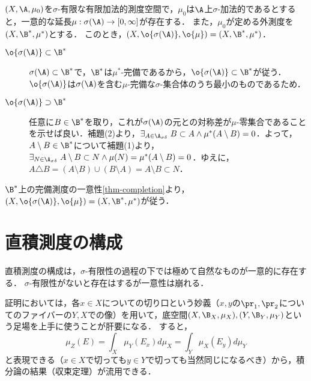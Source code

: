 \documentclass[uplatex, dvipdfmx]{jsreport}
\begin{document}
\begin{theorem}[完備化]\label{thm-complesion-and-extension}
    $(X,\A,\mu_0)$を$\sigma$-有限な有限加法的測度空間で，$\mu_0$は$\A$上$\sigma$-加法的であるとすると，一意的な延長$\mu:\sigma(\A)\to[0,\infty]$が存在する．
    また，$\mu_0$が定める外測度を$(X,\B^*,\mu^*)$とする．
    このとき，$(X,\o{\sigma(\A)},\o{\mu})=(X,\B^*,\mu^*)$．
\end{theorem}
\begin{Proof}\mbox{}
    \begin{description}
        \item[$\o{\sigma(\A)}\subset\B^*$] $\sigma(\A)\subset\B^*$で，$\B^*$は$\mu^*$-完備であるから，$\o{\sigma(\A)}\subset\B^*$が従う．$\o{\sigma(\A)}$は$\sigma(\A)$を含む$\mu$-完備な$\sigma$-集合体のうち最小のものであるため．
        \item[$\o{\sigma(\A)}\supset\B^*$] 任意に$B\in\B^*$を取り，これが$\sigma(\A)$の元との対称差が$\mu$-零集合であることを示せば良い．補題(2)より，$\exists_{A\in\A_{\sigma\delta}}\;B\subset A\land \mu^*(A\setminus B)=0$．よって，$A\setminus B\in\B^*$について補題(1)より，$\exists_{N\in\A_{\sigma\delta}}\;A\setminus B\subset N\land \mu(N)=\mu^*(A\setminus B)=0$．ゆえに，$A\triangle B=(A\setminus B)\cup(B\setminus A)=A\setminus B\subset N$．
    \end{description}
    $\B^*$上の完備測度の一意性\ref{thm-completion}より，$(X,\o{\sigma(\A)},\o{\mu})=(X,\B^*,\mu^*)$が従う．
\end{Proof}

\section{直積測度の構成}

\begin{tcolorbox}[colframe=ForestGreen, colback=ForestGreen!10!white,breakable,colbacktitle=ForestGreen!40!white,coltitle=black,fonttitle=\bfseries\sffamily,
title=直積測度を積分形で捉える]
    直積測度の構成は，$\sigma$-有限性の過程の下では極めて自然なものが一意的に存在する．
    $\sigma$-有限性がないと存在はするが一意性は崩れる．

    証明においては，各$x\in X$についての切り口という妙義（$x,y$の$\pr_1,\pr_2$についてのファイバーの$Y,X$での像）を用いて，底空間$(X,\B_X,\mu_X),(Y,\B_Y,\mu_Y)$という足場を上手に使うことが肝要になる．
    すると，
    \[\mu_Z(E)=\int_X\mu_Y(E_x)d\mu_X=\int_Y\mu_X(E_y)d\mu_Y\]
    と表現できる（$x\in X$で切っても$y\in Y$で切っても当然同じになるべき）から，積分論の結果（収束定理）が流用できる．
\end{tcolorbox}
\end{document}
